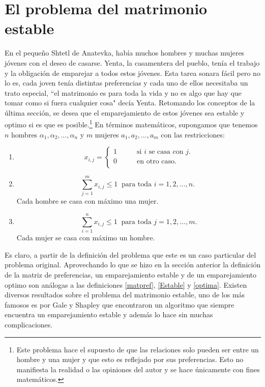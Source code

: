 \chapter{El problema del matrimonio estable} \label{me}
En el pequeño Shtetl de Anatevka, había muchos hombres y muchas mujeres jóvenes con el deseo de casarse. Yenta, la casamentera del pueblo, tenía el trabajo y la obligación de emparejar a todos estos jóvenes. Esta tarea sonara fácil pero no lo es, cada joven tenía distintas preferencias y cada uno de ellos necesitaba un trato especial, ``el matrimonio es para toda la vida y no es algo que hay que tomar como si fuera cualquier cosa" decía Yenta. Retomando los conceptos de la última sección, se desea que el emparejamiento de estos jóvenes sea estable y optimo si es que es posible.\footnote{Este problema hace el supuesto de que las relaciones solo pueden ser entre un hombre y una mujer y que esto es reflejado por sus preferencias. Esto no manifiesta la realidad o las opiniones del autor y se hace únicamente con fines matemáticos.}
En términos matemáticos, supongamos que tenemos $n$ hombres $\alpha_1,\alpha_2,\ldots,\alpha_n$ y $m$ mujeres $a_1, a_2,\ldots,a_m$ con las restricciones:
\begin{enumerate}
\item \begin{equation} \label{1r1}
x_{i,j}= 
\begin{cases}
1 & \qquad \text{si $i$ se casa con $j$.} \\
0 &\qquad\text{en otro caso.}\ \\ 
\end{cases} \end{equation}
\item \begin{equation} \label{1r2}
\sum_{j=1}^{m}x_{i,j} \leq1 \ \text{ para toda $i=1,2,\ldots,n$. }
\end{equation} Cada hombre se casa con máximo una mujer. 
\item \begin{equation} \label{1r3}
\sum_{i=1}^{n} x_{i,j} \leq 1\ \text{ para toda $j=1,2,\dots,m$.} 
\end{equation}
Cada mujer se casa con máximo un hombre. 
\end{enumerate}

Es claro, a partir de la definición del problema que este es un caso particular del problema original. Aprovechando lo que se hizo en la sección anterior la definición de la matriz de preferencias, un emparejamiento estable y de un emparejamiento optimo son análogas a las definiciones \ref{matpref}, \ref{Estable} y \ref{optima}. Existen diversos resultados sobre el problema del matrimonio estable, uno de los más famosos es por Gale y Shapley que encontraron un algoritmo que siempre encuentra un emparejamiento estable y además lo hace sin muchas complicaciones. 

